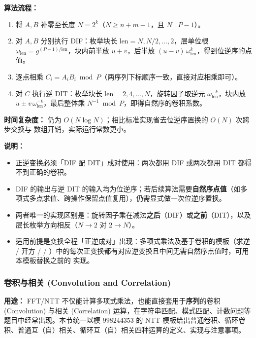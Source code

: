 \textbf{算法流程：}
\begin{enumerate}
    \item 将 $A,B$ 补零至长度 $N=2^k$（$N\ge n+m-1$，且 $N\mid P-1$）。
    \item 对 $A,B$ 分别执行 DIF：枚举块长 $\text{len}=N,N/2,\dots,2$，层单位根 $\omega_{\text{len}}=g^{(P-1)/\text{len}}$，块内前半放 $u+v$，后半放 $(u-v)\,\omega_{\text{len}}^{k}$，得到位逆序的点值。
    \item 逐点相乘 $C_i=A_iB_i\bmod P$（两序列下标顺序一致，直接对应相乘即可）。
    \item 对 $C$ 执行逆 DIT：枚举块长 $\text{len}=2,4,\dots,N$，旋转因子取逆元 $\omega_{\text{len}}^{-k}$，块内放 $u\pm v\,\omega_{\text{len}}^{-k}$，最后整体乘 $N^{-1}\bmod P$，即得自然序的卷积系数。
\end{enumerate}

\textbf{时间复杂度：} 仍为 $O(N\log N)$；相比标准实现省去位逆序置换的 $O(N)$ 次跨步交换与  数组开销，实际运行常数更小。



\textbf{说明：}
\begin{itemize}
    \item 正逆变换必须「DIF 配 DIT」成对使用：两次都用 DIF 或两次都用 DIT 都得不到正确的卷积。
    \item DIF 的输出与逆 DIT 的输入均为位逆序；若后续算法需要\textbf{自然序点值}（如多项式多点求值、跨操作保留点值复用），仍需显式做一次位逆序置换。
    \item 两者唯一的实现区别是：旋转因子乘在减法\textbf{之后}（DIF）或\textbf{之前}（DIT），以及层长枚举方向相反（$N\to2$ 对 $2\to N$）。
    \item 适用前提是变换全程「正逆成对」出现：多项式乘法及基于卷积的模板（求逆 / 开方 /  / ）中的每次正变换都有对应逆变换且中间无需自然序点值时，可用本模板替换之前的  实现。
\end{itemize}

\subsubsection{卷积与相关 (Convolution and Correlation)}

\textbf{用途：}  
FFT/NTT 不仅能计算多项式乘法，也能直接套用于\textbf{序列}的卷积 (Convolution) 与相关 (Correlation) 运算，在字符串匹配、模式匹配、计数问题等题目中经常出现。本节统一以模 $998244353$ 的 NTT 模板给出普通卷积、循环卷积、普通互（自）相关、循环互（自）相关四种运算的定义、实现与注意事项。

